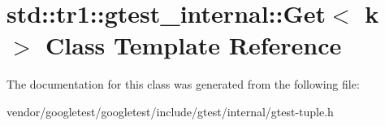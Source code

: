 \hypertarget{classstd_1_1tr1_1_1gtest__internal_1_1Get}{}\section{std\+:\+:tr1\+:\+:gtest\+\_\+internal\+:\+:Get$<$ k $>$ Class Template Reference}
\label{classstd_1_1tr1_1_1gtest__internal_1_1Get}


The documentation for this class was generated from the following file\+:\begin{DoxyCompactItemize}
\item 
vendor/googletest/googletest/include/gtest/internal/gtest-\/tuple.\+h\end{DoxyCompactItemize}
